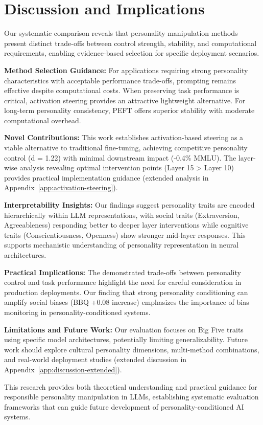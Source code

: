 \section{Discussion and Implications}

Our systematic comparison reveals that personality manipulation methods present distinct trade-offs between control strength, stability, and computational requirements, enabling evidence-based selection for specific deployment scenarios.

\textbf{Method Selection Guidance:} For applications requiring strong personality characteristics with acceptable performance trade-offs, prompting remains effective despite computational costs. When preserving task performance is critical, activation steering provides an attractive lightweight alternative. For long-term personality consistency, PEFT offers superior stability with moderate computational overhead.

\textbf{Novel Contributions:} This work establishes activation-based steering as a viable alternative to traditional fine-tuning, achieving competitive personality control (d = 1.22) with minimal downstream impact (-0.4\% MMLU). The layer-wise analysis revealing optimal intervention points (Layer 15 > Layer 10) provides practical implementation guidance (extended analysis in Appendix~\ref{app:activation-steering}).

\textbf{Interpretability Insights:} Our findings suggest personality traits are encoded hierarchically within LLM representations, with social traits (Extraversion, Agreeableness) responding better to deeper layer interventions while cognitive traits (Conscientiousness, Openness) show stronger mid-layer responses. This supports mechanistic understanding of personality representation in neural architectures.

\textbf{Practical Implications:} The demonstrated trade-offs between personality control and task performance highlight the need for careful consideration in production deployments. Our finding that strong personality conditioning can amplify social biases (BBQ +0.08 increase) emphasizes the importance of bias monitoring in personality-conditioned systems.

\textbf{Limitations and Future Work:} Our evaluation focuses on Big Five traits using specific model architectures, potentially limiting generalizability. Future work should explore cultural personality dimensions, multi-method combinations, and real-world deployment studies (extended discussion in Appendix~\ref{app:discussion-extended}).

This research provides both theoretical understanding and practical guidance for responsible personality manipulation in LLMs, establishing systematic evaluation frameworks that can guide future development of personality-conditioned AI systems.
